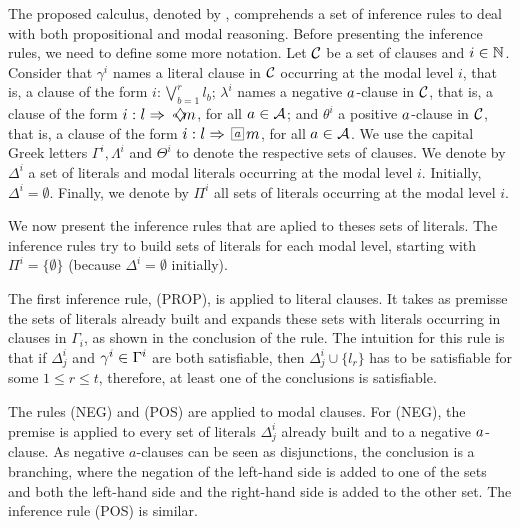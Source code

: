 The proposed calculus, denoted by \ckn, comprehends a set of inference rules to
deal with both propositional and modal reasoning. Before presenting the
inference rules, we need to define some more notation. Let $\set{C}$ be a set of
clauses and $i \in \Nat$. Consider that $\gamma^i$ names a literal clause in
$\set{C}$ occurring at the modal level $i$, that is, a clause of the form $i:
\bigvee^r_{b=1} l_b$; $\lambda^i$ names a negative $\agent$-clause in $\set{C}$,
that is, a clause of the form $i : l \then \pos{\agent}m$, for all $\agent \in
\Agents$; and $\theta^i$ a positive $\agent$-clause in $\set{C}$, that is, a
clause of the form $i : l \then \nec{a}m$, for all $\agent \in \Agents$. We use
the capital Greek letters $\Gamma^i, \Lambda^i$ and $\Theta^i$ to denote the
respective sets of clauses. We denote by $\Delta^i$ a set of literals and modal
literals occurring at the modal level $i$. Initially, $\Delta^i =\emptyset$.
Finally, we denote by $\Pi^i$ all sets of literals occurring at the modal
level $i$.

We now present the inference rules that are aplied to theses sets of literals. The inference rules try to build sets of literals for each modal level, starting with $\Pi^i = \{\emptyset\}$ (because $\Delta^i = \emptyset$ initially). 

The first inference rule, (PROP), is applied to literal clauses. It takes as premisse the sets of literals already built and expands these sets with literals occurring in clauses in $\Gamma_i$, as shown in the conclusion of the rule. The
intuition for this rule is that if $\Delta^i_j$ and $\gamma^\ml \in \Gamma^\ml$
are both satisfiable, then $\Delta^i_j \cup \{l_r\}$ has to be satisfiable for
some $1 \leq r \leq t$, therefore, at least one of the conclusions is
satisfiable.

The rules (NEG) and (POS) are applied to modal clauses. For (NEG), the premise
is applied to every set of literals $\Delta^i_j$ already built and to a negative
$\agent$-clause. As negative $a$-clauses can be seen as disjunctions, the
conclusion is a branching, where the negation of the left-hand side is added to
one of the sets and both the left-hand side and the right-hand side is added to
the other set. The inference rule (POS) is similar.

